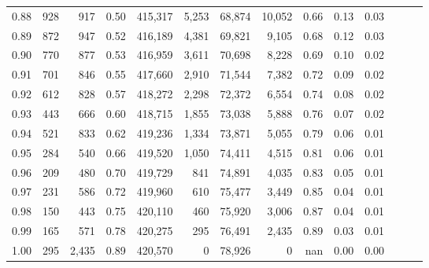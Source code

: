 \begin{tabular}{rrrrrrrrrrrrrr}
0.88 &     928 &    917 &  0.50 &  415,317 &    5,253 &  68,874 &  10,052 &  0.66 &  0.13 &      0.03 \\
0.89 &     872 &    947 &  0.52 &  416,189 &    4,381 &  69,821 &   9,105 &  0.68 &  0.12 &      0.03 \\
0.90 &     770 &    877 &  0.53 &  416,959 &    3,611 &  70,698 &   8,228 &  0.69 &  0.10 &      0.02 \\
0.91 &     701 &    846 &  0.55 &  417,660 &    2,910 &  71,544 &   7,382 &  0.72 &  0.09 &      0.02 \\
0.92 &     612 &    828 &  0.57 &  418,272 &    2,298 &  72,372 &   6,554 &  0.74 &  0.08 &      0.02 \\
0.93 &     443 &    666 &  0.60 &  418,715 &    1,855 &  73,038 &   5,888 &  0.76 &  0.07 &      0.02 \\
0.94 &     521 &    833 &  0.62 &  419,236 &    1,334 &  73,871 &   5,055 &  0.79 &  0.06 &      0.01 \\
0.95 &     284 &    540 &  0.66 &  419,520 &    1,050 &  74,411 &   4,515 &  0.81 &  0.06 &      0.01 \\
0.96 &     209 &    480 &  0.70 &  419,729 &      841 &  74,891 &   4,035 &  0.83 &  0.05 &      0.01 \\
0.97 &     231 &    586 &  0.72 &  419,960 &      610 &  75,477 &   3,449 &  0.85 &  0.04 &      0.01 \\
0.98 &     150 &    443 &  0.75 &  420,110 &      460 &  75,920 &   3,006 &  0.87 &  0.04 &      0.01 \\
0.99 &     165 &    571 &  0.78 &  420,275 &      295 &  76,491 &   2,435 &  0.89 &  0.03 &      0.01 \\
1.00 &     295 &  2,435 &  0.89 &  420,570 &        0 &  78,926 &       0 &   nan &  0.00 &      0.00 \\
\bottomrule
\end{tabular}
